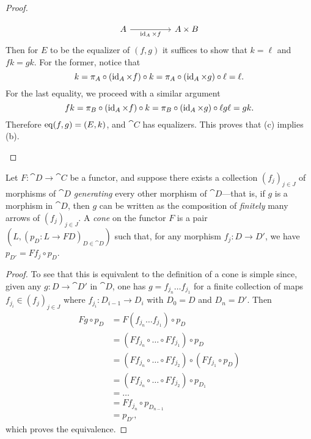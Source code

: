 \begin{proof}
\begin{itemize}
\[\begin{tikzcd}
                      A \ar[rr, "\Id_A \times f"']
                      &&A \times B
                  \end{tikzcd}
              \]
              Then for \(E\) to be the equalizer of \((f,g)\) it suffices to show that
              \(k = \ell\) and \(f k = g k\). For the former, notice that
              \[
                  k = \pi_A \circ (\operatorname{id}_A \times f) \circ k
                  = \pi_A \circ (\operatorname{id}_A \times g) \circ \ell
                  = \ell.
              \]
              For the last equality, we proceed with a similar argument
              \[
                  f k = \pi_B \circ (\operatorname{id}_A \times f) \circ k
                  = \pi_B \circ (\operatorname{id}_A \times g) \circ \ell
                  g \ell
                  = g k.
              \]
              Therefore \(\operatorname{eq}(f, g) = (E, k)\), and \(\cat C\) has equalizers. This proves
              that (c) implies (b).
    \end{itemize}
\end{proof}

\begin{proposition}
    \label{prop:equiv-def-cone-on-func-from-graph}
    Let \(F: \cat D \to \cat C\) be a functor, and suppose there exists a collection
    \((f_j)_{j \in J}\) of morphisms of \(\cat D\) \emph{generating} every other
    morphism of \(\cat D\)---that is, if \(g\) is a morphism in \(\cat D\), then
    \(g\) can be written as the composition of \emph{finitely} many arrows of
    \((f_j)_{j \in J}\). A \emph{cone} on the functor \(F\) is a pair \((L, (p_D: L
    \to F D)_{D \in \cat D})\) such that, for any morphism \(f_j: D \to D'\), we
    have \(p_{D'} = F f_j \circ p_D\).
\end{proposition}

\begin{proof}
    To see that this is equivalent to the definition of a cone is simple since,
    given any \(g: D \to \cat D'\) in \(\cat D\), one has
    \(g = f_{j_n} \dots f_{j_1}\) for a finite collection of maps
    \(f_{j_i} \in (f_j)_{j \in J}\) where \(f_{j_i}: D_{i-1} \to D_i\) with
    \(D_0 = D\) and \(D_n = D'\). Then
    \begin{align*}
        F g \circ p_D
         & = F (f_{j_n} \dots f_{j_1}) \circ p_D                                 \\
         & = (F f_{j_n} \circ \dots \circ F f_{j_1}) \circ p_D                   \\
         & = (F f_{j_n} \circ \dots \circ F f_{j_2}) \circ (F f_{j_1} \circ p_D) \\
         & = (F f_{j_n} \circ \dots \circ F f_{j_2}) \circ p_{D_1}               \\
         & = \dots                                                               \\
         & = F f_{j_n} \circ p_{D_{n-1}}                                         \\
         & = p_{D'},
    \end{align*}
    which proves the equivalence.
\end{proof}

